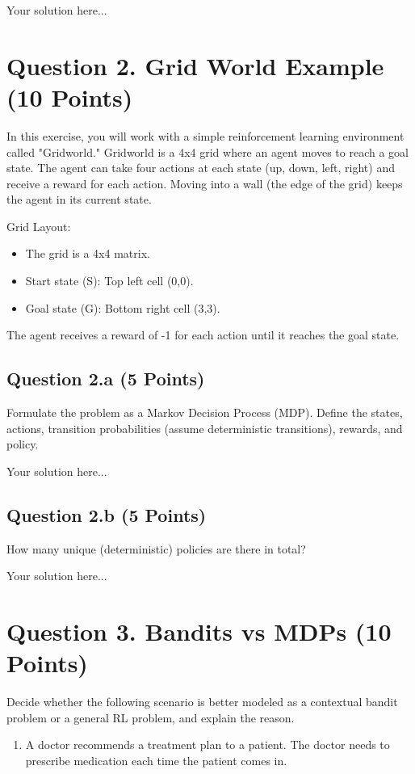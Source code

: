 \documentclass[12pt]{article}
\begin{document}
\begin{solution}
Your solution here...
\end{solution}


\section*{Question 2. Grid World Example (10 Points)}

In this exercise, you will work with a simple reinforcement learning environment called "Gridworld." Gridworld is a 4x4 grid where an agent moves to reach a goal state. The agent can take four actions at each state (up, down, left, right) and receive a reward for each action. Moving into a wall (the edge of the grid) keeps the agent in its current state.

Grid Layout:
\begin{itemize}
\item The grid is a 4x4 matrix.
\item Start state (S): Top left cell (0,0).
\item Goal state (G): Bottom right cell (3,3).
\end{itemize}
The agent receives a reward of -1 for each action until it reaches the goal state.


\subsection*{Question 2.a (5 Points)}
Formulate the problem as a Markov Decision Process (MDP). Define the states, actions, transition probabilities (assume deterministic transitions), rewards, and policy.
\begin{solution}
Your solution here...
\end{solution}

\subsection*{Question 2.b (5 Points)} How many unique (deterministic) policies are there in total?
\begin{solution}
Your solution here...
\end{solution}

\section*{Question 3. Bandits vs MDPs (10 Points)}
 Decide whether the following scenario is better modeled as a contextual bandit problem or a general RL problem, and explain the reason.
                \begin{enumerate}

                    \item A doctor recommends a treatment plan to a patient. The doctor needs to prescribe medication each time the patient comes in.
                \end{enumerate}
\end{document}
